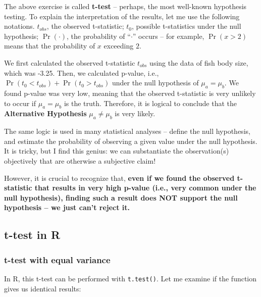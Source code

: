 \documentclass[
]{article}
\begin{document}
The above exercise is called \textbf{t-test} -- perhaps, the most well-known hypothesis testing. To explain the interpretation of the results, let me use the following notations. \(t_{obs}\), the observed t-statistic; \(t_0\), possible t-statistics under the null hypothesis; \(\Pr(\cdot)\), the probability of ``\(\cdot\)'' occurs -- for example, \(\Pr(x > 2)\) means that the probability of \(x\) exceeding \(2\).

We first calculated the observed t-statistic \(t_{obs}\) using the data of fish body size, which was -3.25. Then, we calculated p-value, i.e., \(\Pr(t_0 < t_{obs}) + \Pr(t_0 > t_{obs})\) under the null hypothesis of \(\mu_a = \mu_b\). We found p-value was very low, meaning that the observed t-statistic is very unlikely to occur if \(\mu_a = \mu_b\) is the truth. Therefore, it is logical to conclude that the \textbf{Alternative Hypothesis} \(\mu_a \ne \mu_b\) is very likely.

The same logic is used in many statistical analyses -- define the null hypothesis, and estimate the probability of observing a given value under the null hypothesis. It is tricky, but I find this genius: we can substantiate the observation(s) objectively that are otherwise a subjective claim!

However, it is crucial to recognize that, \textbf{even if we found the observed t-statistic that results in very high p-value (i.e., very common under the null hypothesis), finding such a result does NOT support the null hypothesis -- we just can't reject it.}

\hypertarget{t-test-in-r}{%
\subsection{t-test in R}\label{t-test-in-r}}

\hypertarget{t-test-with-equal-variance}{%
\subsubsection{t-test with equal variance}\label{t-test-with-equal-variance}}

In R, this t-test can be performed with \texttt{t.test()}. Let me examine if the function gives us identical results:
\end{document}
